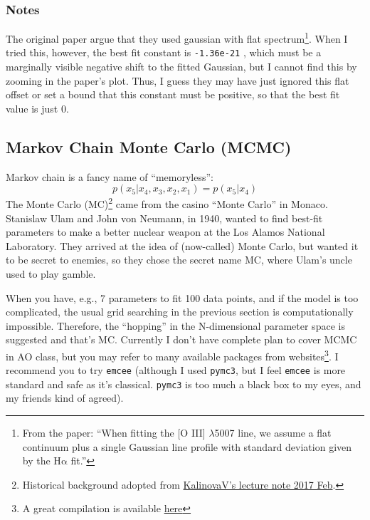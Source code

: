 \subsubsection*{Notes}
The original paper argue that they used gaussian with flat spectrum\footnote{From the paper: ``When fitting the [O III] $ \lambda $5007 line, we assume a flat continuum plus a single Gaussian line profile with standard deviation given by the $ \mathrm{H\alpha} $ fit.''}. When I tried this, however, the best fit constant is \texttt{-1.36e-21} , which must be a marginally visible negative shift to the fitted Gaussian, but I cannot find this by zooming in the paper's plot. Thus, I guess they may have just ignored this flat offset or set a bound that this constant must be positive, so that the best fit value is just 0.


\subsection{Markov Chain Monte Carlo (MCMC)}
Markov chain is a fancy name of ``memoryless'':
\begin{equation}\label{eq: markov chain}
  p(x_5|x_4, x_3, x_2, x_1) = p(x_5|x_4)
\end{equation}
The Monte Carlo (MC)\footnote{Historical background adopted from \href{https://events.mpifr-bonn.mpg.de/indico/event/30/material/slides/12.pdf}{KalinovaV's lecture note 2017 Feb}.} came from the casino ``Monte Carlo'' in Monaco. Stanislaw Ulam and John von Neumann, in 1940, wanted to find best-fit parameters to make a better nuclear weapon at the Los Alamos National Laboratory. They arrived at the idea of (now-called) Monte Carlo, but wanted it to be secret to enemies, so they chose the secret name MC, where Ulam's uncle used to play gamble. 

When you have, e.g., 7 parameters to fit 100 data points, and if the model is too complicated, the usual grid searching in the previous section is computationally impossible. Therefore, the ``hopping'' in the N-dimensional parameter space is suggested and that's MC. Currently I don't have complete plan to cover MCMC in AO class, but you may refer to many available packages from websites\footnote{A great compilation is available \href{https://gabriel-p.github.io/pythonMCMC/?fbclid=IwAR2hxgATmm1w-QFAjsjcrTbpOHeGV3aJKCCpSnnSuimEXLk9xtC3lpzXgo0}{here}}. I recommend you to try \texttt{emcee} (although I used \texttt{pymc3}, but I feel \texttt{emcee} is more standard and safe as it's classical. \texttt{pymc3} is too much a black box to my eyes, and my friends kind of agreed).


